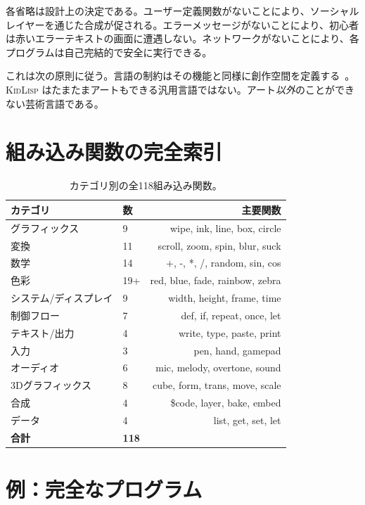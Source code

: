 \documentclass[10pt,letterpaper,twocolumn]{article}
\newcommand{\kl}{\textsc{KidLisp}}
\begin{document}
各省略は設計上の決定である。ユーザー定義関数がないことにより、ソーシャルレイヤーを通じた合成が促される。エラーメッセージがないことにより、初心者は赤いエラーテキストの画面に遭遇しない。ネットワークがないことにより、各プログラムは自己完結的で安全に実行できる。

これは次の原則に従う。言語の制約はその機能と同様に創作空間を定義する~\citep{papert1980mindstorms, compton2015casual}。\kl{} はたまたまアートもできる汎用言語ではない。アート\emph{以外}のことができない芸術言語である。

\section{組み込み関数の完全索引}

\begin{table}[h]
\small
\centering
\begin{tabularx}{\columnwidth}{Xlr}
\toprule
\textbf{カテゴリ} & \textbf{数} & \textbf{主要関数} \\
\midrule
グラフィックス & 9 & wipe, ink, line, box, circle \\
変換 & 11 & scroll, zoom, spin, blur, suck \\
数学 & 14 & +, -, *, /, random, sin, cos \\
色彩 & 19+ & red, blue, fade, rainbow, zebra \\
システム/ディスプレイ & 9 & width, height, frame, time \\
制御フロー & 7 & def, if, repeat, once, let \\
テキスト/出力 & 4 & write, type, paste, print \\
入力 & 3 & pen, hand, gamepad \\
オーディオ & 6 & mic, melody, overtone, sound \\
3Dグラフィックス & 8 & cube, form, trans, move, scale \\
合成 & 4 & \$code, layer, bake, embed \\
データ & 4 & list, get, set, let \\
\midrule
\textbf{合計} & \textbf{118} & \\
\bottomrule
\end{tabularx}
\caption{カテゴリ別の全118組み込み関数。}
\label{tab:builtins}
\end{table}

\section{例：完全なプログラム}
\end{document}
